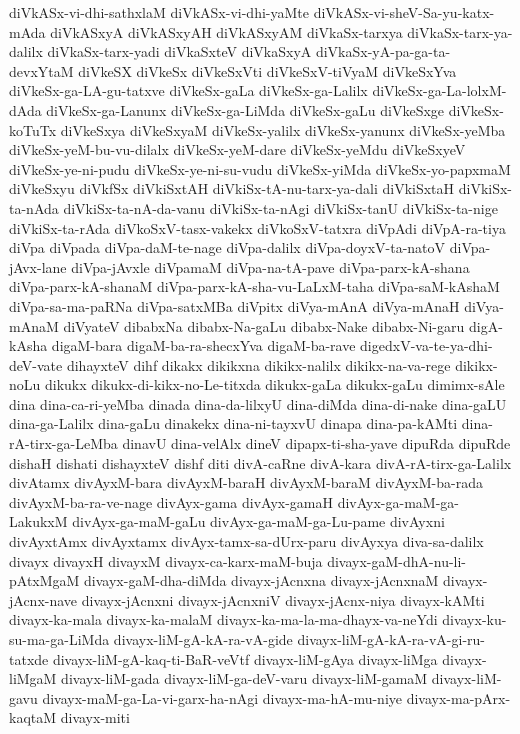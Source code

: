 {diVkASx-vi-dhi-sathxlaM
diVkASx-vi-dhi-yaMte
diVkASx-vi-sheV-Sa-yu-katx-mAda
diVkASxyA
diVkASxyAH
diVkASxyAM
diVkaSx-tarxya
diVkaSx-tarx-ya-dalilx
diVkaSx-tarx-yadi
diVkaSxteV
diVkaSxyA
diVkaSx-yA-pa-ga-ta-devxYtaM
diVkeSX
diVkeSx
diVkeSxVti
diVkeSxV-tiVyaM
diVkeSxYva
diVkeSx-ga-LA-gu-tatxve
diVkeSx-gaLa
diVkeSx-ga-Lalilx
diVkeSx-ga-La-lolxM-dAda
diVkeSx-ga-Lanunx
diVkeSx-ga-LiMda
diVkeSx-gaLu
diVkeSxge
diVkeSx-koTuTx
diVkeSxya
diVkeSxyaM
diVkeSx-yalilx
diVkeSx-yanunx
diVkeSx-yeMba
diVkeSx-yeM-bu-vu-dilalx
diVkeSx-yeM-dare
diVkeSx-yeMdu
diVkeSxyeV
diVkeSx-ye-ni-pudu
diVkeSx-ye-ni-su-vudu
diVkeSx-yiMda
diVkeSx-yo-papxmaM
diVkeSxyu
diVkfSx
diVkiSxtAH
diVkiSx-tA-nu-tarx-ya-dali
diVkiSxtaH
diVkiSx-ta-nAda
diVkiSx-ta-nA-da-vanu
diVkiSx-ta-nAgi
diVkiSx-tanU
diVkiSx-ta-nige
diVkiSx-ta-rAda
diVkoSxV-tasx-vakekx
diVkoSxV-tatxra
diVpAdi
diVpA-ra-tiya
diVpa
diVpada
diVpa-daM-te-nage
diVpa-dalilx
diVpa-doyxV-ta-natoV
diVpa-jAvx-lane
diVpa-jAvxle
diVpamaM
diVpa-na-tA-pave
diVpa-parx-kA-shana
diVpa-parx-kA-shanaM
diVpa-parx-kA-sha-vu-LaLxM-taha
diVpa-saM-kAshaM
diVpa-sa-ma-paRNa
diVpa-satxMBa
diVpitx
diVya-mAnA
diVya-mAnaH
diVya-mAnaM
diVyateV
dibabxNa
dibabx-Na-gaLu
dibabx-Nake
dibabx-Ni-garu
digA-kAsha
digaM-bara
digaM-ba-ra-shecxYva
digaM-ba-rave
digedxV-va-te-ya-dhi-deV-vate
dihayxteV
dihf
dikakx
dikikxna
dikikx-nalilx
dikikx-na-va-rege
dikikx-noLu
dikukx
dikukx-di-kikx-no-Le-titxda
dikukx-gaLa
dikukx-gaLu
dimimx-sAle
dina
dina-ca-ri-yeMba
dinada
dina-da-lilxyU
dina-diMda
dina-di-nake
dina-gaLU
dina-ga-Lalilx
dina-gaLu
dinakekx
dina-ni-tayxvU
dinapa
dina-pa-kAMti
dina-rA-tirx-ga-LeMba
dinavU
dina-velAlx
dineV
dipapx-ti-sha-yave
dipuRda
dipuRde
dishaH
dishati
dishayxteV
dishf
diti
divA-caRne
divA-kara
divA-rA-tirx-ga-Lalilx
divAtamx
divAyxM-bara
divAyxM-baraH
divAyxM-baraM
divAyxM-ba-rada
divAyxM-ba-ra-ve-nage
divAyx-gama
divAyx-gamaH
divAyx-ga-maM-ga-LakukxM
divAyx-ga-maM-gaLu
divAyx-ga-maM-ga-Lu-pame
divAyxni
divAyxtAmx
divAyxtamx
divAyx-tamx-sa-dUrx-paru
divAyxya
diva-sa-dalilx
divayx
divayxH
divayxM
divayx-ca-karx-maM-buja
divayx-gaM-dhA-nu-li-pAtxMgaM
divayx-gaM-dha-diMda
divayx-jAcnxna
divayx-jAcnxnaM
divayx-jAcnx-nave
divayx-jAcnxni
divayx-jAcnxniV
divayx-jAcnx-niya
divayx-kAMti
divayx-ka-mala
divayx-ka-malaM
divayx-ka-ma-la-ma-dhayx-va-neYdi
divayx-ku-su-ma-ga-LiMda
divayx-liM-gA-kA-ra-vA-gide
divayx-liM-gA-kA-ra-vA-gi-ru-tatxde
divayx-liM-gA-kaq-ti-BaR-veVtf
divayx-liM-gAya
divayx-liMga
divayx-liMgaM
divayx-liM-gada
divayx-liM-ga-deV-varu
divayx-liM-gamaM
divayx-liM-gavu
divayx-maM-ga-La-vi-garx-ha-nAgi
divayx-ma-hA-mu-niye
divayx-ma-pArx-kaqtaM
divayx-miti
}
